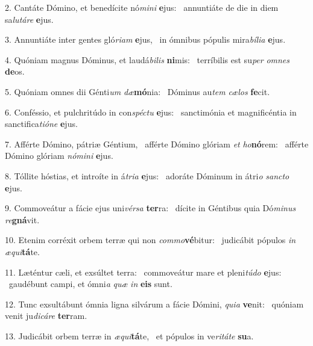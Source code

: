 2. Cantáte Dómino, et benedícite nó\textit{mi}\textit{ni} \textbf{e}jus: \ast\  annuntiáte de die in diem sa\textit{lu}\textit{tá}\textit{re} \textbf{e}jus.\

3. Annuntiáte inter gentes gló\textit{ri}\textit{am} \textbf{e}jus, \ast\  in ómnibus pópulis mira\textit{bí}\textit{li}\textit{a} \textbf{e}jus.\

4. Quóniam magnus Dóminus, et laudá\textit{bi}\textit{lis} \textbf{ni}mis: \ast\  terríbilis est su\textit{per} \textit{om}\textit{nes} \textbf{de}os.\

5. Quóniam omnes dii Génti\textit{um} \textit{dæ}\textbf{mó}nia: \ast\  Dóminus au\textit{tem} \textit{cæ}\textit{los} \textbf{fe}cit.\

6. Conféssio, et pulchritúdo in con\textit{spéc}\textit{tu} \textbf{e}jus: \ast\  sanctimónia et magnificéntia in sanctifica\textit{ti}\textit{ó}\textit{ne} \textbf{e}jus.\

7. Afférte Dómino, pátriæ Géntium, \dag\  afférte Dómino glóriam \textit{et} \textit{ho}\textbf{nó}rem: \ast\  afférte Dómino glóriam \textit{nó}\textit{mi}\textit{ni} \textbf{e}jus.\

8. Tóllite hóstias, et introíte in á\textit{tri}\textit{a} \textbf{e}jus: \ast\  adoráte Dóminum in átri\textit{o} \textit{sanc}\textit{to} \textbf{e}jus.\

9. Commoveátur a fácie ejus uni\textit{vér}\textit{sa} \textbf{ter}ra: \ast\  dícite in Géntibus quia Dó\textit{mi}\textit{nus} \textit{re}\textbf{gná}vit.\

10. Etenim corréxit orbem terræ qui non \textit{com}\textit{mo}\textbf{vé}bitur: \ast\  judicábit pópulos \textit{in} \textit{æ}\textit{qui}\textbf{tá}te.\

11. Læténtur cæli, et exsúltet terra: \dag\  commoveátur mare et pleni\textit{tú}\textit{do} \textbf{e}jus: \ast\  gaudébunt campi, et ómni\textit{a} \textit{quæ} \textit{in} \textbf{e}\textbf{is} sunt.\

12. Tunc exsultábunt ómnia ligna silvárum a fácie Dómini, \textit{qui}\textit{a} \textbf{ve}nit: \ast\  quóniam venit ju\textit{di}\textit{cá}\textit{re} \textbf{ter}ram.\

13. Judicábit orbem terræ in \textit{æ}\textit{qui}\textbf{tá}te, \ast\  et pópulos in ve\textit{ri}\textit{tá}\textit{te} \textbf{su}a.\

